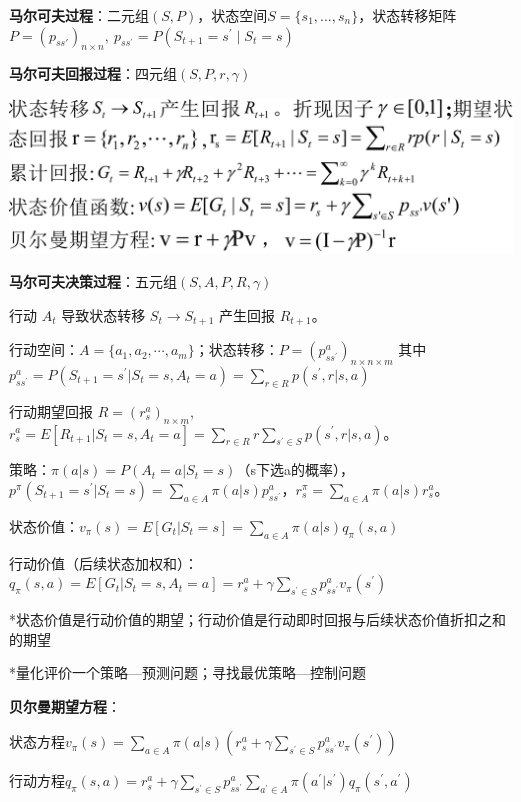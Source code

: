 	\textbf{马尔可夫过程}：二元组$(S,P)$，状态空间$S=\{s_1,...,s_n\}$，状态转移矩阵$P=(p_{ss'})_{n\times n},~p_{ss^{\prime}} = P\left(S_{t+1} = s^{\prime} \mid S_{t} = s\right)$
	
	\textbf{马尔可夫回报过程}：四元组$(S,P,r,\gamma)$
	
	\begin{figurehere}
		\centering
		\includegraphics[width=1\linewidth]{image11}
		\label{fig:image11}
	\end{figurehere}
	\textbf{马尔可夫决策过程}：五元组$(S,A,P,R,\gamma)$
	
	行动 $A_{t}$ 导致状态转移 $S_{t}\rightarrow S_{t+1}$ 产生回报 $R_{t+1}$。
	
	行动空间：$A=\{a_{1},a_{2},\cdots,a_{m}\}$；状态转移：$P=(p_{ss^{\prime}}^{a})_{n\times n\times m}$ 其中 $p_{ss^{\prime}}^{a}=P(S_{t+1}=s^{\prime}|S_{t}=s,A_{t}=a)=\sum_{r\in R}p(s^{\prime},r|s,a)$
	
	行动期望回报 $R=(r_{s}^{a})_{n\times m}$, $r_{s}^{a}=E[R_{t+1}|S_{t}=s,A_{t}=a]=\sum_{r\in R}r\sum_{s^{\prime}\in S}p(s^{\prime},r|s,a)$。
	
	策略：$\pi(a|s)=P(A_{t}=a|S_{t}=s)$（s下选a的概率），$p^{\pi}(S_{t+1}=s^{\prime}|S_{t}=s)=\sum_{a\in A}\pi(a|s)p_{ss^{\prime}}^{a}$，$r_{s}^{\pi}=\sum_{a\in A}\pi(a|s)r_{s}^{a}$。
	
	状态价值：$v_{\pi}(s)=E[G_{t}|S_{t}=s]=\sum_{a\in A}\pi(a|s)q_{\pi}(s,a)$
	
	行动价值（后续状态加权和）：$q_{\pi}(s,a)=E[G_{t}|S_{t}=s,A_{t}=a]=\boxed{r_{s}^{a}+\gamma\textstyle\sum_{s^{\prime}\in S}p_{ss^{\prime}}^{a}v_{\pi}(s^{\prime})}$
	
	*状态价值是行动价值的期望；行动价值是行动即时回报与后续状态价值折扣之和的期望
	
	*量化评价一个策略—预测问题；寻找最优策略—控制问题
	
	\textbf{贝尔曼期望方程}：
	
	状态方程$v_{\pi}(s)=\sum_{a\in A}\pi(a|s)\left(r_{s}^{a}+\gamma\sum_{s^{\prime}\in S}p_{ss^{\prime}}^{a}v_{\pi}(s^{\prime})\right)$
	
	行动方程$q_{\pi}(s, a)=r_{s}^{a}+\gamma\sum_{s^{\prime}\in S}p_{ss^{\prime}}^{a}\sum_{a^{\prime}\in A}\pi(a^{\prime}|s^{\prime})q_{\pi}(s^{\prime},a^{\prime})$
	
